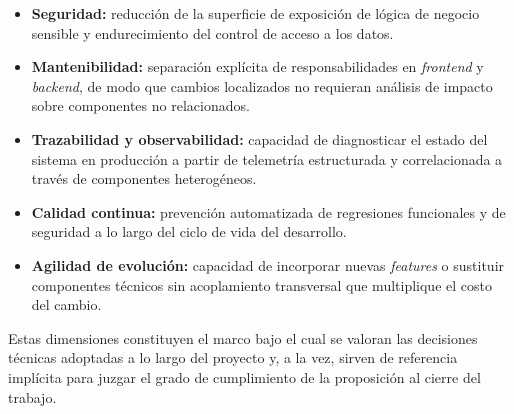 \begin{itemize}
  \item \textbf{Seguridad:} reducción de la superficie de exposición de lógica de negocio sensible y endurecimiento del control de acceso a los datos.
  \item \textbf{Mantenibilidad:} separación explícita de responsabilidades en \textit{frontend} y \textit{backend}, de modo que cambios localizados no requieran análisis de impacto sobre componentes no relacionados.
  \item \textbf{Trazabilidad y observabilidad:} capacidad de diagnosticar el estado del sistema en producción a partir de telemetría estructurada y correlacionada a través de componentes heterogéneos.
  \item \textbf{Calidad continua:} prevención automatizada de regresiones funcionales y de seguridad a lo largo del ciclo de vida del desarrollo.
  \item \textbf{Agilidad de evolución:} capacidad de incorporar nuevas \textit{features} o sustituir componentes técnicos sin acoplamiento transversal que multiplique el costo del cambio.
\end{itemize}

Estas dimensiones constituyen el marco bajo el cual se valoran las decisiones técnicas adoptadas a lo largo del proyecto y, a la vez, sirven de referencia implícita para juzgar el grado de cumplimiento de la proposición al cierre del trabajo.
